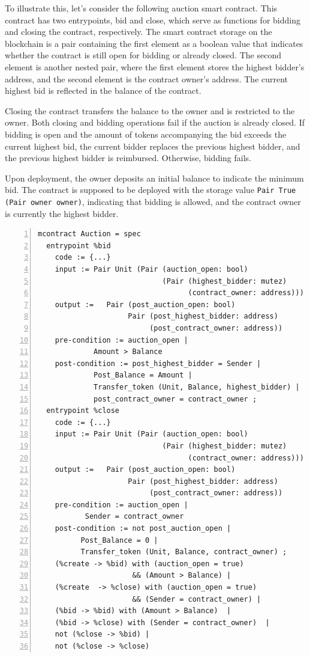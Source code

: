 \documentclass[a4paper,UKenglish,cleveref, autoref, thm-restate]{lipics-v2021}
\begin{document}
To illustrate this, let's consider the following auction smart contract. This contract has two entrypoints, bid and close, which serve as functions for bidding and closing the contract, respectively. The smart contract storage on the blockchain is a pair containing the first element as a boolean value that indicates whether the contract is still open for bidding or already closed. The second element is another nested pair, where the first element  stores the highest bidder's address, and the second element is the contract owner's address. The current highest bid is reflected in the balance of the contract.

Closing the contract transfers the balance to the owner and is restricted to the owner. Both closing and bidding operations fail if the auction is already closed. If bidding is open and the amount of tokens accompanying the bid exceeds the current highest bid, the current bidder replaces the previous highest bidder, and the previous highest bidder is reimbursed. Otherwise, bidding fails.

Upon deployment, the owner deposits an initial balance to indicate the minimum bid. The contract is supposed to be deployed with the storage value  \lstinline/Pair True (Pair owner owner)/, indicating that bidding is allowed, and the contract owner is currently the highest bidder.

\begin{lstlisting}[float,captionpos=b,caption={Auction contract specification},label={lst:auction-contract-specification},numbers=left]
mcontract Auction = spec 
  entrypoint %bid
    code := {...}
    input := Pair Unit (Pair (auction_open: bool) 
                             (Pair (highest_bidder: mutez)
                                   (contract_owner: address)))
    output :=   Pair (post_auction_open: bool) 
                     Pair (post_highest_bidder: address)
                          (post_contract_owner: address))
    pre-condition := auction_open |
             Amount > Balance
    post-condition := post_highest_bidder = Sender |
             Post_Balance = Amount |
             Transfer_token (Unit, Balance, highest_bidder) |
             post_contract_owner = contract_owner ;
  entrypoint %close
    code := {...}
    input := Pair Unit (Pair (auction_open: bool) 
                             (Pair (highest_bidder: mutez)
                                   (contract_owner: address)))
    output :=   Pair (post_auction_open: bool) 
                     Pair (post_highest_bidder: address)
                          (post_contract_owner: address))
    pre-condition := auction_open |
           Sender = contract_owner                
    post-condition := not post_auction_open |
          Post_Balance = 0 |
          Transfer_token (Unit, Balance, contract_owner) ;
    (%create -> %bid) with (auction_open = true)  
                      && (Amount > Balance) | 
    (%create  -> %close) with (auction_open = true) 
                      && (Sender = contract_owner) |
    (%bid -> %bid) with (Amount > Balance)  | 
    (%bid -> %close) with (Sender = contract_owner)  | 
    not (%close -> %bid) |
    not (%close -> %close)
\end{lstlisting}
\end{document}
